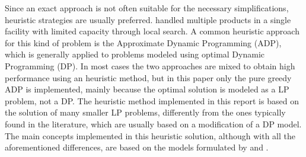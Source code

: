 \documentclass{article}
\begin{document}
Since an exact approach is not often suitable for the necessary simplifications, heuristic strategies are usually preferred. \cite{Wagner2004} handled multiple products in a single facility with limited capacity through local search. A common heuristic approach for this kind of problem is the Approximate Dynamic Programming (ADP), which is generally applied to problems modeled using optimal Dynamic Programming (DP). In most cases the two approaches are mixed to obtain high performance using an heuristic method, but in this paper only the pure greedy ADP is implemented, mainly because the optimal solution is modeled as a LP problem, not a DP. The heuristic method implemented in this report is based on the solution of many smaller LP problems, differently from the ones typically found in the literature, which are usually based on a modification of a DP model. The main concepts implemented in this heuristic solution, although with all the aforementioned differences, are based on the models formulated by \cite{Cimen2013} and \cite{Meiss2018}. 
\par
\newpage
\end{document}
